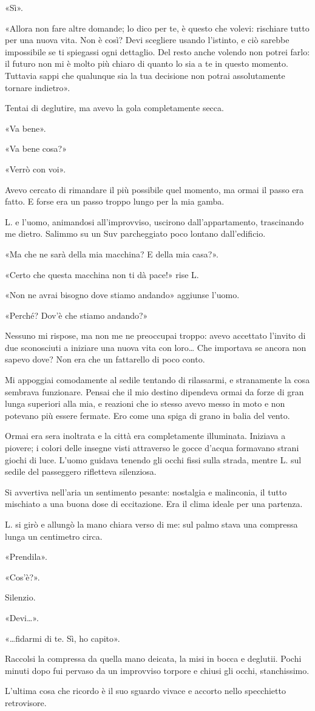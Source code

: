 «Sì».

«Allora non fare altre domande; lo dico per te, è questo che volevi: rischiare tutto per una nuova
vita. Non è così? Devi scegliere usando l'istinto, e ciò sarebbe impossibile se ti spiegassi ogni
dettaglio. Del resto anche volendo non potrei farlo: il futuro non mi è molto più chiaro di quanto
lo sia a te in questo momento. Tuttavia sappi che qualunque sia la tua decisione non potrai
assolutamente tornare indietro».

Tentai di deglutire, ma avevo la gola completamente secca.

«Va bene».

«Va bene cosa?»

«Verrò con voi».

Avevo cercato di rimandare il più possibile quel momento, ma ormai il passo era fatto. E forse era
un passo troppo lungo per la mia gamba.

L. e l'uomo, animandosi all'improvviso, uscirono dall'appartamento, trascinando me dietro. Salimmo
su un Suv parcheggiato poco lontano dall'edificio.

«Ma che ne sarà della mia macchina? E della mia casa?».

«Certo che questa macchina non ti dà pace!» rise L.

«Non ne avrai bisogno dove stiamo andando» aggiunse l'uomo.

«Perché? Dov'è che stiamo andando?»

Nessuno mi rispose, ma non me ne preoccupai troppo: avevo accettato l'invito di due sconosciuti a
iniziare una nuova vita con loro\dots{} Che importava se ancora non sapevo dove? Non era che un
fattarello di poco conto.

Mi appoggiai comodamente al sedile tentando di rilassarmi, e stranamente la cosa sembrava
funzionare. Pensai che il mio destino dipendeva ormai da forze di gran lunga superiori alla mia, e
reazioni che io stesso avevo messo in moto e non potevano più essere fermate. Ero come una spiga di
grano in balia del vento.

Ormai era sera inoltrata e la città era completamente illuminata. Iniziava a piovere; i colori delle
insegne visti attraverso le gocce d'acqua formavano strani giochi di luce. L'uomo guidava tenendo
gli occhi fissi sulla strada, mentre L. sul sedile del passeggero rifletteva silenziosa.

Si avvertiva nell'aria un sentimento pesante: nostalgia e malinconia, il tutto mischiato a una buona
dose di eccitazione. Era il clima ideale per una partenza.

L. si girò e allungò la mano chiara verso di me: sul palmo stava una compressa lunga un centimetro
circa.

«Prendila».

«Cos'è?».

Silenzio.

«Devi\dots{}».

«\dots{}fidarmi di te. Sì, ho capito».

Raccolsi la compressa da quella mano deicata, la misi in bocca e deglutii. Pochi minuti dopo fui
pervaso da un improvviso torpore e chiusi gli occhi, stanchissimo.

L'ultima cosa che ricordo è il suo sguardo vivace e accorto nello specchietto retrovisore.
